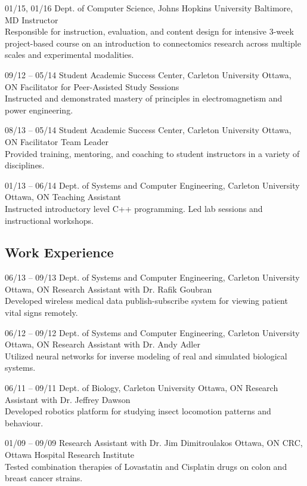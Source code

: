 \documentclass[]{friggeri-cv} %
\begin{document}
\begin{entrylist}
\entry
{01/15, 01/16}
{Dept. of Computer Science, Johns Hopkins University}
{Baltimore, MD}
{Instructor\\
Responsible for instruction, evaluation, and content design for intensive 3-week project-based course on an introduction to connectomics research across multiple scales and experimental modalities.}

\entry
{09/12 -- 05/14}
{Student Academic Success Center, Carleton University}
{Ottawa, ON}
{Facilitator for Peer-Assisted Study Sessions\\
Instructed and demonstrated mastery of principles in electromagnetism and power engineering.}

\entry
{08/13 -- 05/14}
{Student Academic Success Center, Carleton University}
{Ottawa, ON}
{Facilitator Team Leader\\
Provided training, mentoring, and coaching to student instructors in a variety of disciplines.}

\entry
{01/13 -- 06/14}
{Dept. of Systems and Computer Engineering, Carleton University}
{Ottawa, ON}
{Teaching Assistant\\
Instructed introductory level C++ programming. Led lab sessions and instructional workshops.}
\end{entrylist}

\subsection{Work Experience}

\begin{entrylist}
\entry
{06/13 -- 09/13}
{Dept. of Systems and Computer Engineering, Carleton University}
{Ottawa, ON}
{Research Assistant with Dr. Rafik Goubran\\
Developed wireless medical data publish-subscribe system for viewing patient vital signs remotely.}

\entry
{06/12 -- 09/12}
{Dept. of Systems and Computer Engineering, Carleton University}
{Ottawa, ON}
{Research Assistant with Dr. Andy Adler\\
Utilized neural networks for inverse modeling of real and simulated biological systems.}

\entry
{06/11 -- 09/11}
{Dept. of Biology, Carleton University}
{Ottawa, ON}
{Research Assistant with Dr. Jeffrey Dawson\\
Developed robotics platform for studying insect locomotion patterns and behaviour.}

\entry
{01/09 -- 09/09}
{Research Assistant with Dr. Jim Dimitroulakos}
{Ottawa, ON}
{CRC, Ottawa Hospital Research Institute\\
Tested combination therapies of Lovastatin and Cisplatin drugs on colon and breast cancer strains.}
\end{entrylist}
\end{document}
